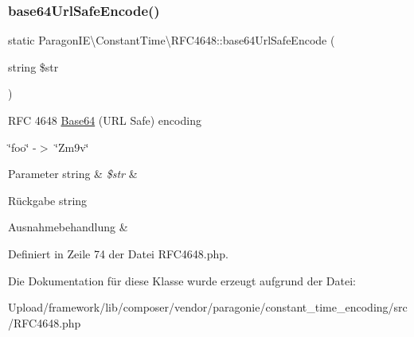 \subsubsection{\texorpdfstring{base64\+Url\+Safe\+Encode()}{base64UrlSafeEncode()}}
{\footnotesize\ttfamily static Paragon\+I\+E\textbackslash{}\+Constant\+Time\textbackslash{}\+R\+F\+C4648\+::base64\+Url\+Safe\+Encode (\begin{DoxyParamCaption}\item[{string}]{\$str }\end{DoxyParamCaption})\hspace{0.3cm}{\ttfamily [static]}}

R\+FC 4648 \mbox{\hyperlink{class_paragon_i_e_1_1_constant_time_1_1_base64}{Base64}} (U\+RL Safe) encoding

\char`\"{}foo\char`\"{} -\/$>$ \char`\"{}\+Zm9v\char`\"{}


\begin{DoxyParams}[1]{Parameter}
string & {\em \$str} & \\
\hline
\end{DoxyParams}
\begin{DoxyReturn}{Rückgabe}
string 
\end{DoxyReturn}

\begin{DoxyExceptions}{Ausnahmebehandlung}
{\em } & \\
\hline
\end{DoxyExceptions}


Definiert in Zeile 74 der Datei R\+F\+C4648.\+php.



Die Dokumentation für diese Klasse wurde erzeugt aufgrund der Datei\+:\begin{DoxyCompactItemize}
\item 
Upload/framework/lib/composer/vendor/paragonie/constant\+\_\+time\+\_\+encoding/src/R\+F\+C4648.\+php\end{DoxyCompactItemize}
